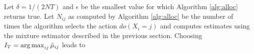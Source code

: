 \begin{theorem}
Let $\delta = 1/(2NT)$ and $\epsilon$ be the smallest value for which Algorithm \ref{alg:alloc} returns true. 
Let $N_{ij}$ as computed by Algorithm \ref{alg:alloc} be the number of times the algorithm selects the action $do(X_i = j)$ 
and computes estimates using the mixture estimator described in the previous section. Choosing $I_T = \argmax_{ij} \hat \mu_{ij}$ leads
to
\end{theorem}














